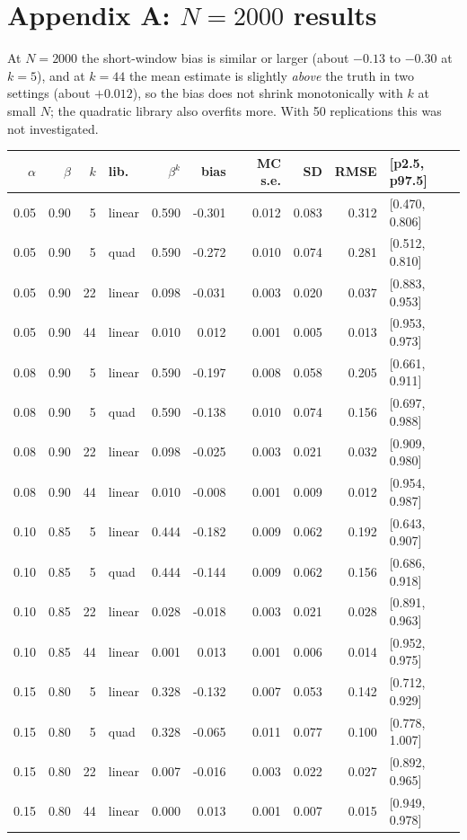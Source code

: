 \documentclass[11pt]{article}
\begin{document}
\section*{Appendix A: $N=2000$ results}
At $N=2000$ the short-window bias is similar or larger (about $-0.13$ to $-0.30$ at $k=5$), and at $k=44$ the mean estimate is slightly \emph{above} the truth in two settings (about $+0.012$), so the bias does not shrink monotonically with $k$ at small $N$; the quadratic library also overfits more. With 50 replications this was not investigated.
\begin{table}[!htbp]\centering\small\begin{tabular}{rrrlrrrrrl}\hline$\alpha$&$\beta$&$k$&lib.&$\beta^k$&bias&MC s.e.&SD&RMSE&[p2.5, p97.5]\\\hline
0.05 & 0.90 & 5 & linear & 0.590 & -0.301 & 0.012 & 0.083 & 0.312 & [0.470, 0.806] \\
0.05 & 0.90 & 5 & quad & 0.590 & -0.272 & 0.010 & 0.074 & 0.281 & [0.512, 0.810] \\
0.05 & 0.90 & 22 & linear & 0.098 & -0.031 & 0.003 & 0.020 & 0.037 & [0.883, 0.953] \\
0.05 & 0.90 & 44 & linear & 0.010 & 0.012 & 0.001 & 0.005 & 0.013 & [0.953, 0.973] \\
0.08 & 0.90 & 5 & linear & 0.590 & -0.197 & 0.008 & 0.058 & 0.205 & [0.661, 0.911] \\
0.08 & 0.90 & 5 & quad & 0.590 & -0.138 & 0.010 & 0.074 & 0.156 & [0.697, 0.988] \\
0.08 & 0.90 & 22 & linear & 0.098 & -0.025 & 0.003 & 0.021 & 0.032 & [0.909, 0.980] \\
0.08 & 0.90 & 44 & linear & 0.010 & -0.008 & 0.001 & 0.009 & 0.012 & [0.954, 0.987] \\
0.10 & 0.85 & 5 & linear & 0.444 & -0.182 & 0.009 & 0.062 & 0.192 & [0.643, 0.907] \\
0.10 & 0.85 & 5 & quad & 0.444 & -0.144 & 0.009 & 0.062 & 0.156 & [0.686, 0.918] \\
0.10 & 0.85 & 22 & linear & 0.028 & -0.018 & 0.003 & 0.021 & 0.028 & [0.891, 0.963] \\
0.10 & 0.85 & 44 & linear & 0.001 & 0.013 & 0.001 & 0.006 & 0.014 & [0.952, 0.975] \\
0.15 & 0.80 & 5 & linear & 0.328 & -0.132 & 0.007 & 0.053 & 0.142 & [0.712, 0.929] \\
0.15 & 0.80 & 5 & quad & 0.328 & -0.065 & 0.011 & 0.077 & 0.100 & [0.778, 1.007] \\
0.15 & 0.80 & 22 & linear & 0.007 & -0.016 & 0.003 & 0.022 & 0.027 & [0.892, 0.965] \\
0.15 & 0.80 & 44 & linear & 0.000 & 0.013 & 0.001 & 0.007 & 0.015 & [0.949, 0.978] \\
\hline\end{tabular}\end{table}
\end{document}
